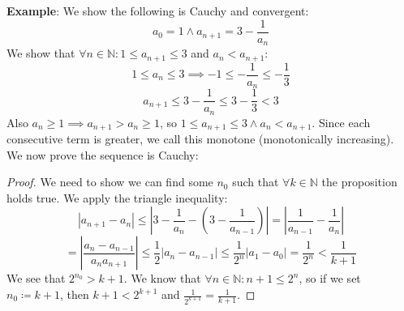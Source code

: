 \documentclass{article}
\begin{document}
\textbf{Example}: We show the following is Cauchy and convergent:
\begin{equation*}
    a_0 = 1 \land a_{n+1} = 3 - \frac{1}{a_n}
\end{equation*}
We show that $\forall n \in \mathbb{N}: 1 \leqslant a_{n+1} \leqslant 3$ and $a_n < a_{n+1}$:
\begin{equation*}
    1 \leqslant a_n \leqslant 3 \implies -1 \leqslant -\frac{1}{a_n} \leqslant -\frac{1}{3}
\end{equation*}
\begin{equation*}
    a_{n+1} \leqslant 3 - \frac{1}{a_n} \leqslant 3 - \frac{1}{3} < 3
\end{equation*}
Also $a_n \geqslant 1 \implies a_{n+1} > a_n \geqslant 1$, so $1 \leqslant a_{n+1} \leqslant 3 \land a_n < a_{n+1}$. Since each consecutive term is greater, we call this monotone (monotonically increasing).\\

We now prove the sequence is Cauchy:
\begin{proof}
We need to show we can find some $n_0$ such that $\forall k \in \mathbb{N}$ the proposition holds true. We apply the triangle inequality:
\begin{equation*}
    |a_{n+1} - a_n| \leqslant \left|3 - \frac{1}{a_n} - (3 - \frac{1}{a_{n-1}})\right| = \left|\frac{1}{a_{n-1}} - \frac{1}{a_n}\right|
\end{equation*}
\begin{equation*}
    = \left|\frac{a_n - a_{n-1}}{a_{n}a_{n+1}}\right| \leqslant \frac{1}{2}|a_n - a_{n-1}| \leqslant \frac{1}{2^n}|a_1 - a_0| = \frac{1}{2^n} < \frac{1}{k+1}
\end{equation*}
We see that $2^{n_0} > k+1$. We know that $\forall n \in \mathbb{N}: n+1 \leqslant 2^n$, so if we set $n_0 \coloneq k+1$, then $k+1 < 2^{k+1}$ and $\frac{1}{2^{k+1}} = \frac{1}{k+1}$.
\end{proof}
\pagebreak
\end{document}
